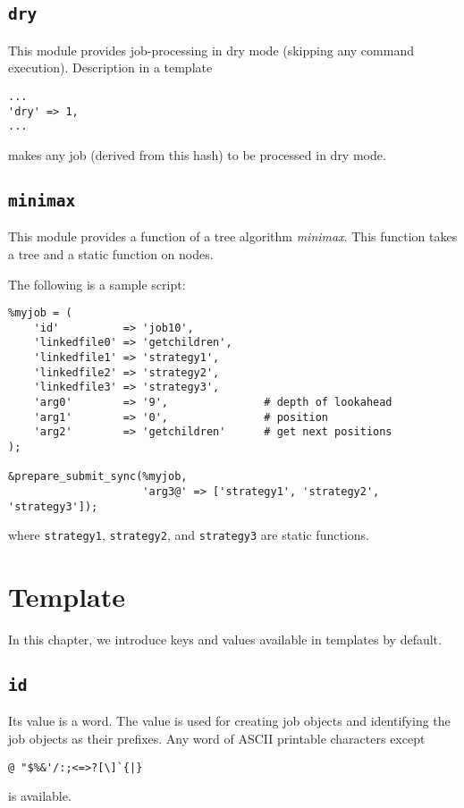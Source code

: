 \documentclass[a4paper,10pt]{report}
\begin{document}
\section{\texttt{dry}}

This module provides job-processing in dry mode (skipping any command
execution).  Description in a template
\begin{boxnote}
\begin{verbatim}
...
'dry' => 1,
...
\end{verbatim}
\end{boxnote}
\noindent
makes any job (derived from this hash) to be processed in dry mode.

\section{\texttt{minimax}}

This module provides a function of a tree algorithm \textit{minimax}.
This function takes a tree and a static function on nodes.

The following is a sample script:
\begin{boxnote}
\begin{verbatim}
%myjob = (
    'id'          => 'job10',
    'linkedfile0' => 'getchildren',
    'linkedfile1' => 'strategy1',
    'linkedfile2' => 'strategy2',
    'linkedfile3' => 'strategy3',
    'arg0'        => '9',               # depth of lookahead
    'arg1'        => '0',               # position
    'arg2'        => 'getchildren'      # get next positions
);

&prepare_submit_sync(%myjob,
                     'arg3@' => ['strategy1', 'strategy2', 'strategy3']);
\end{verbatim}
\end{boxnote}
\noindent
where \texttt{strategy1}, \texttt{strategy2}, and
\texttt{strategy3} are static functions.

\chapter{Template}\label{chapjobdefhash}

In this chapter, we introduce keys and values available in templates
by default.

\section{\texttt{id}}

Its value is a word.  The value is used for creating job objects and
identifying the job objects as their prefixes.  Any word of ASCII
printable characters except
\begin{center}
\verb*+@ "$%&'/:;<=>?[\]`{|}+        %
\end{center}
is available.
\end{document}
